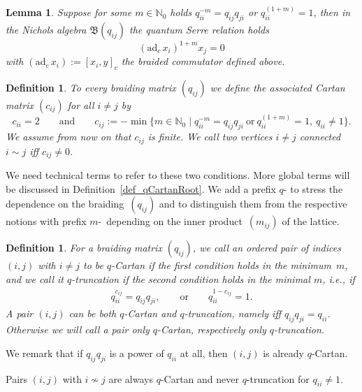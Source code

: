 \documentclass[10pt,a4paper]{amsart}
\numberwithin{equation}{section}
\newtheorem{lem}[teo]{Lemma}
\newtheorem{defin}[teo]{Definition}
\newcommand{\N}{\mathbb{N}}
\begin{document}
\begin{lem}\label{lm_Serre} Suppose for some $m\in\N_0$ holds $q_{ii}^{-m} = q_{ij}q_{ji}$ or $q_{ii}^{(1+m)} = 1$, then in the Nichols algebra $\mathfrak{B}(q_{ij})$ the \emph{quantum Serre relation} holds
	\[(\mathrm{ad}_c\,x_i)^{1+m} x_j=0\]
	with $(\mathrm{ad}_c\,x_i):=[x_i,y]_c$ the braided commutator defined above.
\end{lem}
\begin{defin}
To every braiding matrix $(q_{ij})$ we define the associated Cartan matrix $(c_{ij})$ for all $i\neq j$ by
\begin{equation*}%
c_{ii}=2 \qquad \text{and} \qquad c_{ij}:=-\min  \big\lbrace m \in \N_0 \mid q_{ii}^{-m} = q_{ij}q_{ji} \  \text{or} \  q_{ii}^{(1+m)} = 1,
\ q_{ii}\neq 1\big\rbrace.
\end{equation*} 	
We assume from now on that $c_{ij}$ is finite. We call two vertices $i\neq j$ \emph{connected} $i\sim j$ iff $c_{ij}\neq 0$.
\end{defin}
We need technical terms to refer to these two conditions. More global terms will be discussed in Definition~\ref{def_qCartanRoot}. We add a prefix $q$- to stress the dependence on the braiding~$(q_{ij})$ and to distinguish them from the respective notions with prefix $m$-~depending on the inner product~$(m_{ij})$ of the lattice.
\begin{defin}
	For a braiding matrix $(q_{ij})$, we call an ordered pair of indices $(i,j)$ with $i\neq j$ to be \emph{$q$-Cartan} if the first condition holds in the minimum~$m$, and we call it \emph{$q$-truncation} if the second condition holds in the minimal $m$, i.e., if
	\begin{align*}%
	q_{ii}^{c_{ij}}=q_{ij}q_{ji},  \qquad \text{or}  \qquad q_{ii}^{1-c_{ij}}=1.
	\end{align*}
	A pair $(i,j)$ can be \emph{both} $q$-Cartan and $q$-truncation, namely iff
	$q_{ij}q_{ji}=q_{ii}$.
 	Otherwise we will call a pair \emph{only} $q$-Cartan, respectively \emph{only} $q$-truncation.
\end{defin}

We remark that if $q_{ij}q_{ji}$ is a power of $q_{ii}$ at all, then $(i,j)$ is already $q$-Cartan.

Pairs $(i,j)$ with $i\not\sim j$ are always $q$-Cartan and never $q$-truncation for $q_{ii}\neq 1$.
\end{document}
